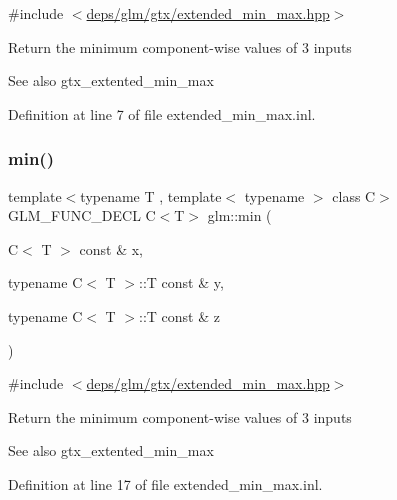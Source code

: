 {\ttfamily \#include $<$\hyperlink{extended__min__max_8hpp}{deps/glm/gtx/extended\+\_\+min\+\_\+max.\+hpp}$>$}

Return the minimum component-\/wise values of 3 inputs \begin{DoxySeeAlso}{See also}
gtx\+\_\+extented\+\_\+min\+\_\+max 
\end{DoxySeeAlso}


Definition at line 7 of file extended\+\_\+min\+\_\+max.\+inl.

\mbox{\label{group__gtx__extended__min__max_ga74d1a96e7cdbac40f6d35142d3bcbbd4}} 
\subsubsection{\texorpdfstring{min()}{min()}\hspace{0.1cm}{\footnotesize\ttfamily [2/6]}}
{\footnotesize\ttfamily template$<$typename T , template$<$ typename $>$ class C$>$ \\
G\+L\+M\+\_\+\+F\+U\+N\+C\+\_\+\+D\+E\+CL C$<$T$>$ glm\+::min (\begin{DoxyParamCaption}\item[{C$<$ T $>$ const \&}]{x,  }\item[{typename C$<$ T $>$\+::T const \&}]{y,  }\item[{typename C$<$ T $>$\+::T const \&}]{z }\end{DoxyParamCaption})}



{\ttfamily \#include $<$\hyperlink{extended__min__max_8hpp}{deps/glm/gtx/extended\+\_\+min\+\_\+max.\+hpp}$>$}

Return the minimum component-\/wise values of 3 inputs \begin{DoxySeeAlso}{See also}
gtx\+\_\+extented\+\_\+min\+\_\+max 
\end{DoxySeeAlso}


Definition at line 17 of file extended\+\_\+min\+\_\+max.\+inl.

